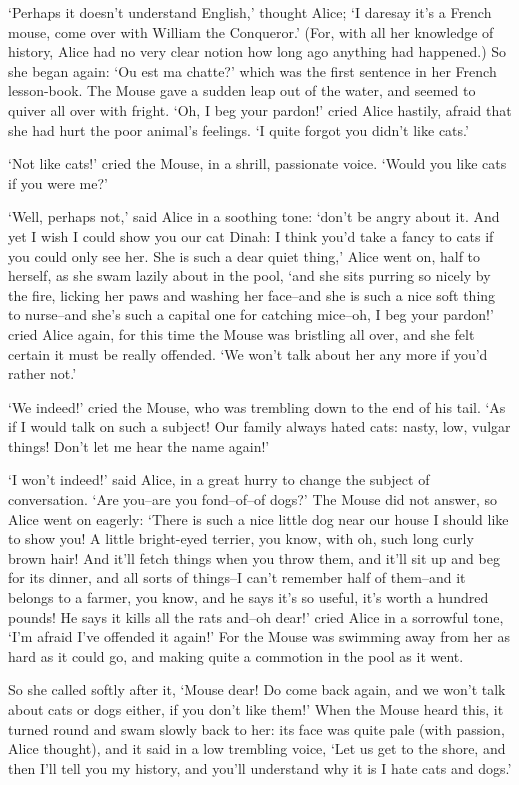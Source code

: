 \documentclass{article}
\begin{document}
`Perhaps it doesn't understand English,' thought Alice; `I daresay it's a French mouse, come over with William the Conqueror.' (For, with all her knowledge of history, Alice had no very clear notion how long ago anything had happened.) So she began again: `Ou est ma chatte?' which was the first sentence in her French lesson-book. The Mouse gave a sudden leap out of the water, and seemed to quiver all over with fright. `Oh, I beg your pardon!' cried Alice hastily, afraid that she had hurt the poor animal's feelings. `I quite forgot you didn't like cats.'

`Not like cats!' cried the Mouse, in a shrill, passionate voice. `Would you like cats if you were me?'

`Well, perhaps not,' said Alice in a soothing tone: `don't be angry about it. And yet I wish I could show you our cat Dinah: I think you'd take a fancy to cats if you could only see her. She is such a dear quiet thing,' Alice went on, half to herself, as she swam lazily about in the pool, `and she sits purring so nicely by the fire, licking her paws and washing her face--and she is such a nice soft thing to nurse--and she's such a capital one for catching mice--oh, I beg your pardon!' cried Alice again, for this time the Mouse was bristling all over, and she felt certain it must be really offended. `We won't talk about her any more if you'd rather not.'

`We indeed!' cried the Mouse, who was trembling down to the end of his tail. `As if I would talk on such a subject! Our family always hated cats: nasty, low, vulgar things! Don't let me hear the name again!'

`I won't indeed!' said Alice, in a great hurry to change the subject of conversation. `Are you--are you fond--of--of dogs?' The Mouse did not answer, so Alice went on eagerly: `There is such a nice little dog near our house I should like to show you! A little bright-eyed terrier, you know, with oh, such long curly brown hair! And it'll fetch things when you throw them, and it'll sit up and beg for its dinner, and all sorts of things--I can't remember half of them--and it belongs to a farmer, you know, and he says it's so useful, it's worth a hundred pounds! He says it kills all the rats and--oh dear!' cried Alice in a sorrowful tone, `I'm afraid I've offended it again!' For the Mouse was swimming away from her as hard as it could go, and making quite a commotion in the pool as it went.

So she called softly after it, `Mouse dear! Do come back again, and we won't talk about cats or dogs either, if you don't like them!' When the Mouse heard this, it turned round and swam slowly back to her: its face was quite pale (with passion, Alice thought), and it said in a low trembling voice, `Let us get to the shore, and then I'll tell you my history, and you'll understand why it is I hate cats and dogs.'
\end{document}

